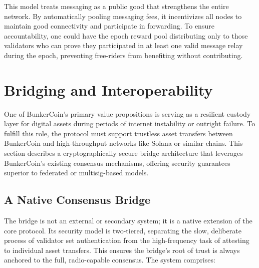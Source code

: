 \documentclass{article}
\begin{document}
This model treats messaging as a public good that strengthens the entire network. By automatically pooling messaging fees, it incentivizes all nodes to maintain good connectivity and participate in forwarding. To ensure accountability, one could have the epoch reward pool distributing only to those validators who can prove they participated in at least one valid message relay during the epoch, 
preventing free-riders from benefiting without contributing.

\section{Bridging and Interoperability}
\label{sec:bridge}

One of BunkerCoin's primary value propositions is serving as a resilient custody layer for digital assets during periods of internet instability or outright failure. To fulfill this role, the protocol must support trustless asset transfers between BunkerCoin and high-throughput networks like Solana or similar chains. This section describes a cryptographically secure bridge architecture that leverages BunkerCoin's existing consensus mechanisms, offering security guarantees superior to federated or multisig-based models.

\subsection{A Native Consensus Bridge}

The bridge is not an external or secondary system; it is a native extension of the core protocol. Its security model is two-tiered, separating the slow, deliberate process of validator set authentication from the high-frequency task of attesting to individual asset transfers. This ensures the bridge's root of trust is always anchored to the full, radio-capable consensus. The system comprises:
\end{document}
